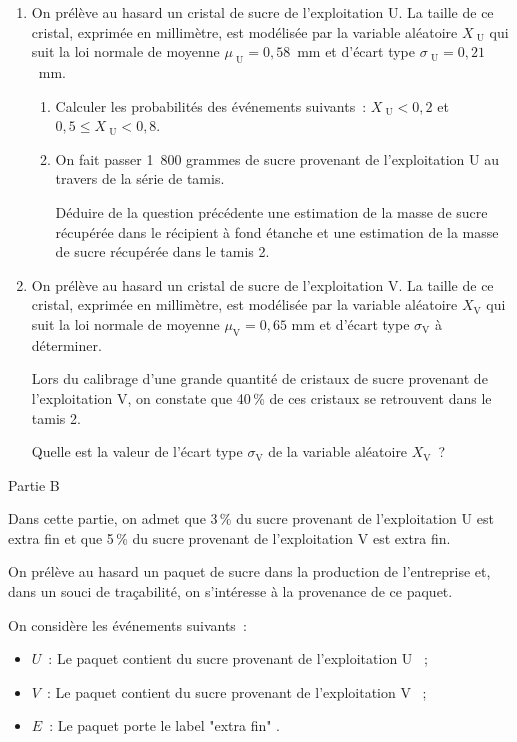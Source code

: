 \begin{enumerate}
     \item On prélève au hasard un cristal de sucre de l'exploitation U. La taille de ce cristal,
     exprimée en millimètre, est modélisée par la variable aléatoire $X_{\text{ U}}$ qui suit la loi normale
     de moyenne $\mu_{\text{ U}} = 0,58$~mm et d'écart type $\sigma_{\text{ U}} = 0,21$~mm.
     \begin{enumerate}[label=\alph*.]
          \item Calculer les probabilités des événements suivants~: $X_{\text{ U}} < 0,2 $ et $ 0,5 \leqslant X_{\text{ U}} < 0,8$.
          \item On fait passer 1~800 grammes de sucre provenant de l'exploitation U au travers de la
          série de tamis.
          \par
          Déduire de la question précédente une estimation de la masse de sucre récupérée dans
          le récipient à fond étanche et une estimation de la masse de sucre récupérée dans le
          tamis 2.
     \end{enumerate}
     \item On prélève au hasard un cristal de sucre de l'exploitation V. La taille de ce cristal,
     exprimée en millimètre, est modélisée par la variable aléatoire $X_{\text{V}}$ qui suit la loi normale
     de moyenne $\mu_{\text{V}} = 0,65$ mm et d'écart type $\sigma_{\text{V}}$ à déterminer.
     \par
     Lors du calibrage d'une grande quantité de cristaux de sucre provenant de l'exploitation V,
     on constate que 40\,\% de ces cristaux se retrouvent dans le tamis 2.
     \par
     Quelle est la valeur de l'écart type $\sigma_{\text{V}}$ de la variable aléatoire $X_{\text{V}}$~?
\end{enumerate}
\begin{center}\begin{h3}Partie B \end{h3}\end{center}
Dans cette partie, on admet que 3\,\% du sucre provenant de l'exploitation U est extra fin et que
5\,\% du sucre provenant de l'exploitation V est extra fin.
\par
On prélève au hasard un paquet de sucre dans la production de l'entreprise et, dans un souci
de traçabilité, on s'intéresse à la provenance de ce paquet.
\par
On considère les événements suivants~:
\begin{indent}
     \begin{itemize}
          \item $U$~: \og  Le paquet contient du sucre provenant de l'exploitation U \fg{}~;
          \item $V$~: \og Le paquet contient du sucre provenant de l'exploitation V \fg{}~;
          \item $E$~: \og Le paquet porte le label "extra fin" \fg{}.
     \end{itemize}
\end{indent}
